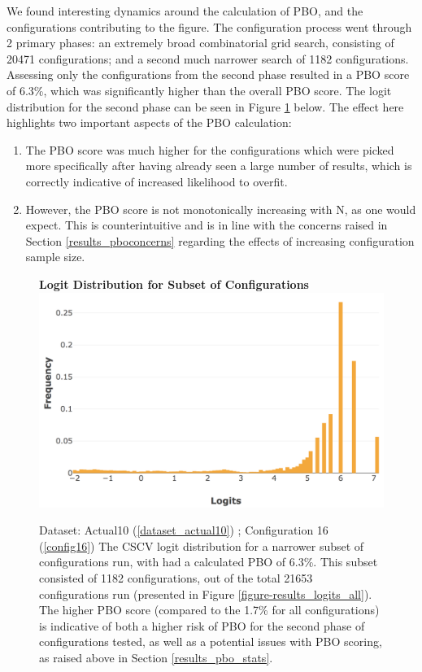 \documentclass[a4paper,11pt,oneside]{article}
\theoremstyle{plain}
\theoremstyle{definition}
\begin{document}
	We found interesting dynamics around the calculation of PBO, and the configurations contributing to the figure. The configuration process went through 2 primary phases: an extremely broad combinatorial grid search, consisting of 20471 configurations; and a second much narrower search of 1182 configurations. Assessing only the configurations from the second phase resulted in a PBO score of 6.3\%, which was significantly higher than the overall PBO score. The logit distribution for the second phase can be seen in Figure \ref{figure-results_logits_subset} below. The effect here highlights two important aspects of the PBO calculation:
	\begin{enumerate}
		\item The PBO score was much higher for the configurations which were picked more specifically after having already seen a large number of results, which is correctly indicative of increased likelihood to overfit.
		\item However, the PBO score is not monotonically increasing with N, as one would expect. This is counterintuitive and is in line with the concerns raised in Section \ref{results_pboconcerns} regarding the effects of increasing configuration sample size.
	\end{enumerate}
	
	\begin{figure}[H]
		\centering 
		\textbf{Logit Distribution for Subset of Configurations}
		\includegraphics[scale=0.4]{images/results/8_9_pbo/subset_dist.png} 
		\caption[Logit Distribution for Subset of Configurations]{Dataset: Actual10 (\ref{dataset_actual10}) ; Configuration 16 (\ref{config16})
			\newline The CSCV logit distribution for a narrower subset of configurations run, with had a calculated PBO of 6.3\%. This subset consisted of 1182 configurations, out of the total 21653 configurations run (presented in Figure \ref{figure-results_logits_all}). The higher PBO score (compared to the 1.7\% for all configurations) is indicative of both a higher risk of PBO for the second phase of configurations tested, as well as a potential issues with PBO scoring, as raised above in Section \ref{results_pbo_stats}.}
		\label{figure-results_logits_subset}
	\end{figure}
	
\end{document}

